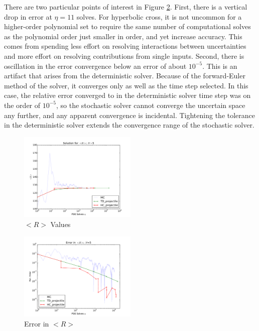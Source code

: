 \documentclass{mc2015}
\begin{document}
There are two particular points of interest in Figure \ref{prj errs}.  First, there is a vertical drop in error at $\eta=11$ solves.  For hyperbolic cross, it is not uncommon for a higher-order polynomial set to require the same number of computational solves as the polynomial order just smaller in order, and yet increase accuracy.  This comes from spending less effort on resolving interactions between uncertainties and more effort on resolving contributions from single inputs.  Second, there is oscillation in the error convergence below an error of about $10^{-5}$.  This is an artifact that arises from the deterministic solver.  Because of the forward-Euler method of the solver, it converges only as well as the time step selected.  In this case, the relative error converged to in the deterministic solver time step was on the order of $10^{-5}$, so the stochastic solver cannot converge the uncertain space any further, and any apparent convergence is incidental.  Tightening the tolerance in the deterministic solver extends the convergence range of the stochastic solver.
\begin{figure}[H]
    \centering
      \includegraphics[width=0.5\textwidth]{../graphics/projectile_solns}
      \caption{$<R>$ Values}
      \label{prj vals}
\end{figure}
\begin{figure}[H]
\centering
      \includegraphics[width=0.5\textwidth]{../graphics/projectile_errs}
      \caption{Error in $<R>$}
      \label{prj errs}
  \end{figure}
\end{document}

